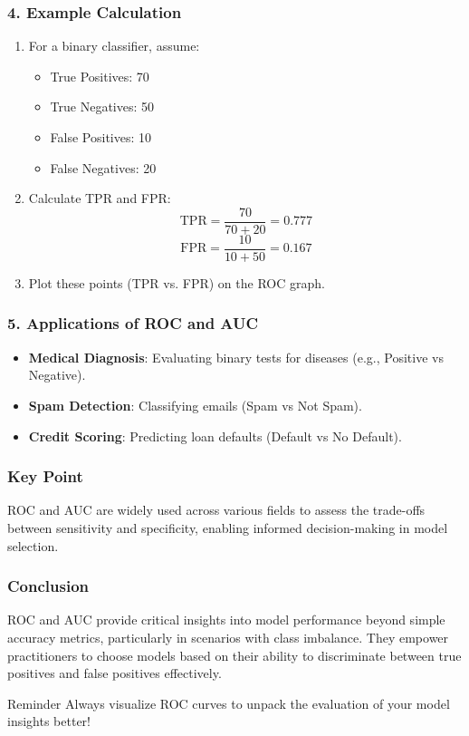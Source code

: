 \documentclass[aspectratio=169]{beamer}
\begin{document}
\begin{frame}[fragile]
    \frametitle{4. Example Calculation}
    \begin{enumerate}
        \item For a binary classifier, assume:
        \begin{itemize}
            \item True Positives: 70
            \item True Negatives: 50
            \item False Positives: 10
            \item False Negatives: 20
        \end{itemize}
        
        \item Calculate TPR and FPR:
        \begin{equation}
            \text{TPR} = \frac{70}{70 + 20} = 0.777
        \end{equation}
        \begin{equation}
            \text{FPR} = \frac{10}{10 + 50} = 0.167
        \end{equation}
        
        \item Plot these points (TPR vs. FPR) on the ROC graph.
    \end{enumerate}
\end{frame}

\begin{frame}[fragile]
    \frametitle{5. Applications of ROC and AUC}
    \begin{itemize}
        \item \textbf{Medical Diagnosis}: Evaluating binary tests for diseases (e.g., Positive vs Negative).
        \item \textbf{Spam Detection}: Classifying emails (Spam vs Not Spam).
        \item \textbf{Credit Scoring}: Predicting loan defaults (Default vs No Default).
    \end{itemize}
\end{frame}

\begin{frame}[fragile]
    \frametitle{Key Point}
    ROC and AUC are widely used across various fields to assess the trade-offs between sensitivity and specificity, enabling informed decision-making in model selection.
\end{frame}

\begin{frame}[fragile]
    \frametitle{Conclusion}
    ROC and AUC provide critical insights into model performance beyond simple accuracy metrics, particularly in scenarios with class imbalance. They empower practitioners to choose models based on their ability to discriminate between true positives and false positives effectively.
    
    \begin{block}{Reminder}
        Always visualize ROC curves to unpack the evaluation of your model insights better!
    \end{block}
\end{frame}
\end{document}
